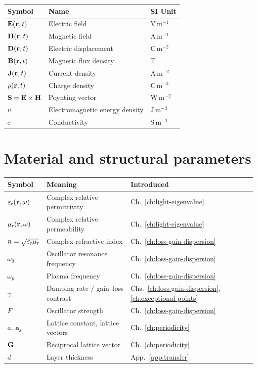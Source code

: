 \begin{center}
\begin{tabular}{lll}
\toprule
Symbol & Name & SI Unit \\
\midrule
$\EE(\rr, t)$ & Electric field & V\,m$^{-1}$ \\
$\HH(\rr, t)$ & Magnetic field & A\,m$^{-1}$ \\
$\DD(\rr, t)$ & Electric displacement & C\,m$^{-2}$ \\
$\BB(\rr, t)$ & Magnetic flux density & T \\
$\JJ(\rr, t)$ & Current density & A\,m$^{-2}$ \\
$\rho(\rr, t)$ & Charge density & C\,m$^{-3}$ \\
$\SS = \EE \times \HH$ & Poynting vector & W\,m$^{-2}$ \\
$u$ & Electromagnetic energy density & J\,m$^{-3}$ \\
$\sigma$ & Conductivity & S\,m$^{-1}$ \\
\bottomrule
\end{tabular}
\end{center}


\section{Material and structural parameters}
\label{sec:material-symbols}

\begin{center}
\begin{tabular}{lll}
\toprule
Symbol & Meaning & Introduced \\
\midrule
$\epsr(\rr,\omega)$ & Complex relative permittivity & Ch.~\ref{ch:light-eigenvalue} \\
$\mur(\rr,\omega)$ & Complex relative permeability & Ch.~\ref{ch:light-eigenvalue} \\
$n = \sqrt{\epsr\mur}$ & Complex refractive index & Ch.~\ref{ch:loss-gain-dispersion} \\
$\omega_0$ & Oscillator resonance frequency & Ch.~\ref{ch:loss-gain-dispersion} \\
$\omega_p$ & Plasma frequency & Ch.~\ref{ch:loss-gain-dispersion} \\
$\gamma$ & Damping rate / gain--loss contrast & Chs.~\ref{ch:loss-gain-dispersion}, \ref{ch:exceptional-points} \\
$F$ & Oscillator strength & Ch.~\ref{ch:loss-gain-dispersion} \\
$a$, $\aa_j$ & Lattice constant, lattice vectors & Ch.~\ref{ch:periodicity} \\
$\GG$ & Reciprocal lattice vector & Ch.~\ref{ch:periodicity} \\
$d$ & Layer thickness & App.~\ref{app:transfer} \\
\bottomrule
\end{tabular}
\end{center}


